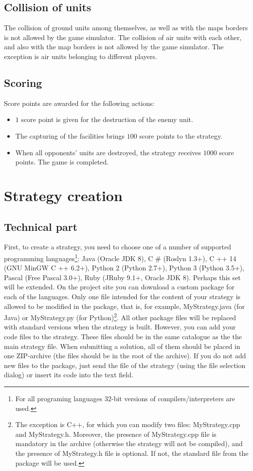 \section{Collision of units}

The collision of ground units among themselves, as well as with the maps borders is not allowed by the game simulator. The collision of air units with each other, and
also with the map borders is not allowed by the game simulator. The exception is air units belonging to different players.

\section{Scoring}

Score points are awarded for the following actions:
\begin{itemize}
    \item $1$ score point is given for the destruction of the enemy unit.
    \item The capturing of the facilities brings $100$ score points to the strategy.
    \item When all opponents’ units are destroyed, the strategy receives $1000$ score points. The game is completed.
\end{itemize}

\chapter{Strategy creation}

\section{Technical part}

First, to create a strategy, you need to choose one of a number of supported programming languages\footnote [4] {For all programing languages
32-bit versions of compilers/interpreters are used.}: Java (Oracle JDK 8), C \# (Roslyn 1.3+), C ++ 14 (GNU MinGW C ++
6.2+), Python 2 (Python 2.7+), Python 3 (Python 3.5+), Pascal (Free Pascal 3.0+), Ruby (JRuby 9.1+, Oracle JDK 8). Perhaps this set
will be extended. On the project site you can download a custom package for each of the languages. Only one file intended for the content of your strategy is allowed to be modified in the package,
that is, for example, MyStrategy.java (for Java) or MyStrategy.py (for
Python)\footnote [5]{The exception is C++, for which you can modify two files: MyStrategy.cpp and MyStrategy.h. Moreover, the presence of
MyStrategy.cpp file is mandatory in the archive (otherwise the strategy will not be compiled), and the presence of MyStrategy.h file is optional.
 If not, the standard file from the package will be used.}. All other package files will be replaced with standard versions when the strategy is built. However, you can add your code files to the strategy. These files should be in the same catalogue as the
the main strategy file. When submitting a solution, all of them should be placed in one ZIP-archive (the files should be in the root of the archive). If
you do not add new files to the package, just send the file of the strategy (using the file selection dialog) or insert its code into the text field.

